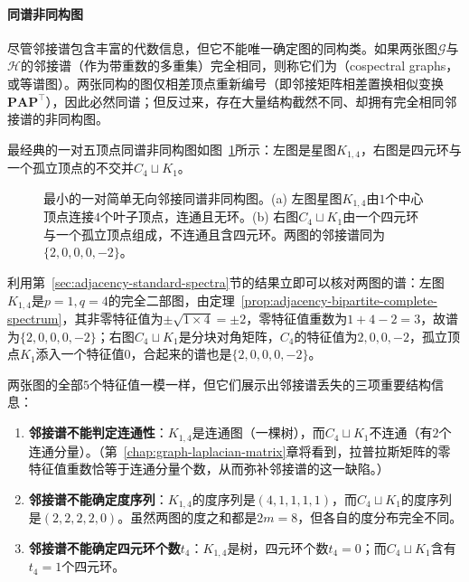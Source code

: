 \paragraph{同谱非同构图}

尽管邻接谱包含丰富的代数信息，但它不能唯一确定图的同构类。如果两张图$\mathcal G$与$\mathcal H$的邻接谱（作为带重数的多重集）完全相同，则称它们为（cospectral graphs，或等谱图）。两张同构的图仅相差顶点重新编号（即邻接矩阵相差置换相似变换$\bm P\bm A\bm P^\top$），因此必然同谱；但反过来，存在大量结构截然不同、却拥有完全相同邻接谱的非同构图。

最经典的一对五顶点同谱非同构图如图~\ref{fig:adjacency-cospectral-pair}所示：左图是星图$K_{1,4}$，右图是四元环与一个孤立顶点的不交并$C_4\sqcup K_1$。

\begin{figure}[!htb]
  \centering
  
  \caption{最小的一对简单无向邻接同谱非同构图。(a) 左图星图$K_{1,4}$由$1$个中心顶点连接$4$个叶子顶点，连通且无环。(b) 右图$C_4\sqcup K_1$由一个四元环与一个孤立顶点组成，不连通且含四元环。两图的邻接谱同为$\{2,0,0,0,-2\}$。}
  \label{fig:adjacency-cospectral-pair}
\end{figure}

利用第~\ref{sec:adjacency-standard-spectra}节的结果立即可以核对两图的谱：左图$K_{1,4}$是$p=1,q=4$的完全二部图，由定理~\ref{prop:adjacency-bipartite-complete-spectrum}，其非零特征值为$\pm\sqrt{1\times 4}=\pm 2$，零特征值重数为$1+4-2=3$，故谱为$\{2,0,0,0,-2\}$；右图$C_4\sqcup K_1$是分块对角矩阵，$C_4$的特征值为$2,0,0,-2$，孤立顶点$K_1$添入一个特征值$0$，合起来的谱也是$\{2,0,0,0,-2\}$。

两张图的全部$5$个特征值一模一样，但它们展示出邻接谱丢失的三项重要结构信息：
\begin{enumerate}
\item \textbf{邻接谱不能判定连通性}：$K_{1,4}$是连通图（一棵树），而$C_4\sqcup K_1$不连通（有$2$个连通分量）。（第~\ref{chap:graph-laplacian-matrix}章将看到，拉普拉斯矩阵的零特征值重数恰等于连通分量个数，从而弥补邻接谱的这一缺陷。）
\item \textbf{邻接谱不能确定度序列}：$K_{1,4}$的度序列是$(4,1,1,1,1)$，而$C_4\sqcup K_1$的度序列是$(2,2,2,2,0)$。虽然两图的度之和都是$2m=8$，但各自的度分布完全不同。
\item \textbf{邻接谱不能确定四元环个数$t_4$}：$K_{1,4}$是树，四元环个数$t_4=0$；而$C_4\sqcup K_1$含有$t_4=1$个四元环。
\end{enumerate}

